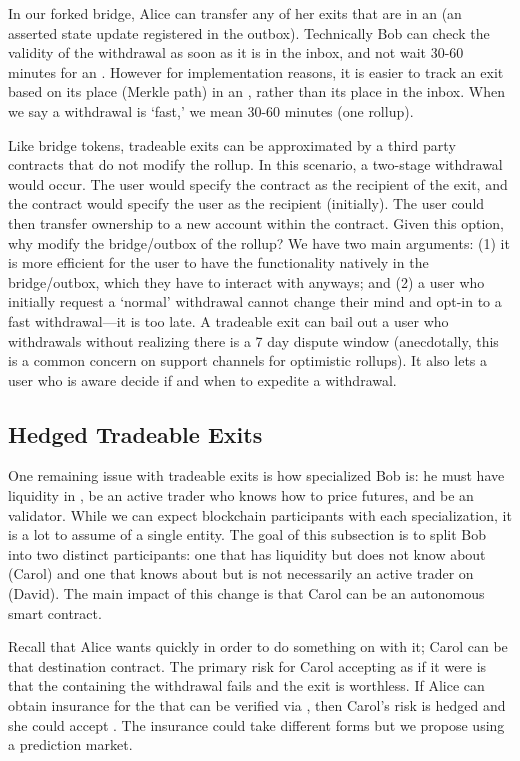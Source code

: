 In our forked bridge, Alice can transfer any of her exits that are in an \rblock (\ie an asserted \layertwo state update registered in the outbox). Technically Bob can check the validity of the withdrawal as soon as it is in the inbox, and not wait 30-60 minutes for an \rblock. However for implementation reasons, it is easier to track an exit based on its place (\ie Merkle path) in an \rblock, rather than its place in the inbox. When we say a withdrawal is `fast,' we mean 30-60 minutes (\ie one \layertwo rollup). 

Like bridge tokens, tradeable exits can be approximated by a third party \layerone contracts that do not modify the rollup. In this scenario, a two-stage withdrawal would occur. The user would specify the contract as the recipient of the exit, and the contract would specify the user as the recipient (initially). The user could then transfer ownership to a new account within the contract. Given this option, why modify the bridge/outbox of the rollup? We have two main arguments: (1) it is more efficient for the user to have the functionality natively in the bridge/outbox, which they have to interact with anyways; and (2) a user who initially request a `normal' withdrawal cannot change their mind and opt-in to a fast withdrawal---it is too late. A tradeable exit can bail out a user who withdrawals without realizing there is a 7 day dispute window (anecdotally, this is a common concern on support channels for optimistic rollups). It also lets a user who is aware decide if and when to expedite a withdrawal.

\subsection{Hedged Tradeable Exits}
\label{sec:PM}

One remaining issue with tradeable exits is how specialized Bob is: he must have liquidity in \ethone, be an active trader who knows how to price futures, and be an \layertwo validator. While we can expect blockchain participants with each specialization, it is a lot to assume of a single entity. The goal of this subsection is to split Bob into two distinct participants: one that has \ethone liquidity but does not know about \layertwo (Carol) and one that knows about \layertwo but is not necessarily an active trader on \layerone (David). The main impact of this change is that Carol can be an autonomous \layerone smart contract. 

Recall that Alice wants \ethone quickly in order to do something on \layerone with it; Carol can be that destination contract. The primary risk for Carol accepting \ethxx as if it were \ethone is that the \rblock containing the \ethxx withdrawal fails and the exit is worthless. If Alice can obtain insurance for the \ethxx that can be verified via \layerone, then Carol's risk is hedged and she could accept \ethxx. The insurance could take different forms but we propose using a prediction market.

